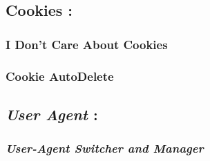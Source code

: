 \documentclass[12pt, a4paper]{article}
\begin{document}
\subsection*{Cookies :}
\subsubsection*{I Don't Care About Cookies}
\subsubsection*{Cookie AutoDelete\\}

\subsection*{\emph{User Agent} :}
\subsubsection*{\emph{User-Agent Switcher and Manager}}
\end{document}
